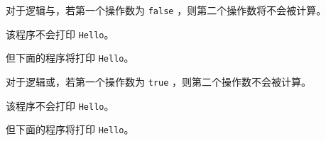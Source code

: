 \begin{frame}[fragile]\ft{\subsecname} 
对于逻辑与，若第一个操作数为 \lstinline|false| ，则第二个操作数将不会被计算。


\vspace{.1in}\pause 

该程序不会打印 \lstinline|Hello|。
\end{frame}

\begin{frame}[fragile]\ft{\subsecname} 
但下面的程序将打印 \lstinline|Hello|。

\end{frame}

\begin{frame}[fragile]\ft{\subsecname} 
对于逻辑或，若第一个操作数为 \lstinline|true| ，则第二个操作数不会被计算。


\vspace{.1in} \pause 

该程序不会打印 \lstinline|Hello|。
\end{frame}

\begin{frame}[fragile]\ft{\subsecname} 

但下面的程序将打印 \lstinline|Hello|。 


\end{frame}
